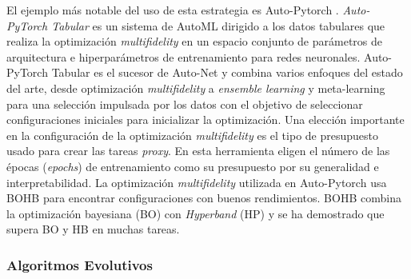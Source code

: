El ejemplo más notable del uso de esta estrategia es Auto-Pytorch \cite{zimmer2021auto}. \textit{Auto-PyTorch Tabular} es un sistema de AutoML dirigido a los datos tabulares que realiza la optimización \textit{multifidelity} en un espacio conjunto de parámetros de arquitectura e hiperparámetros de entrenamiento para redes neuronales. Auto-PyTorch Tabular es el sucesor de Auto-Net \cite{mendoza2016towards} y combina varios enfoques del estado del arte, desde optimización \textit{multifidelity} a \textit{ensemble learning} y meta-learning para una selección impulsada por los datos con el objetivo de seleccionar configuraciones iniciales para inicializar la optimización. Una elección importante en la configuración de la optimización \textit{multifidelity} es el tipo de presupuesto usado para crear las tareas \textit{proxy}. En esta herramienta eligen el número de las épocas (\textit{epochs}) de entrenamiento como su presupuesto por su generalidad e interpretabilidad. La optimización \textit{multifidelity} utilizada en Auto-Pytorch usa BOHB \cite{falkner2018bohb} para encontrar configuraciones con buenos rendimientos. BOHB combina la optimización bayesiana (BO) con \textit{Hyperband} (HP) \cite{li2018hyperband} y se ha demostrado que supera BO y HB en muchas tareas.

\subsubsection{Algoritmos Evolutivos}



